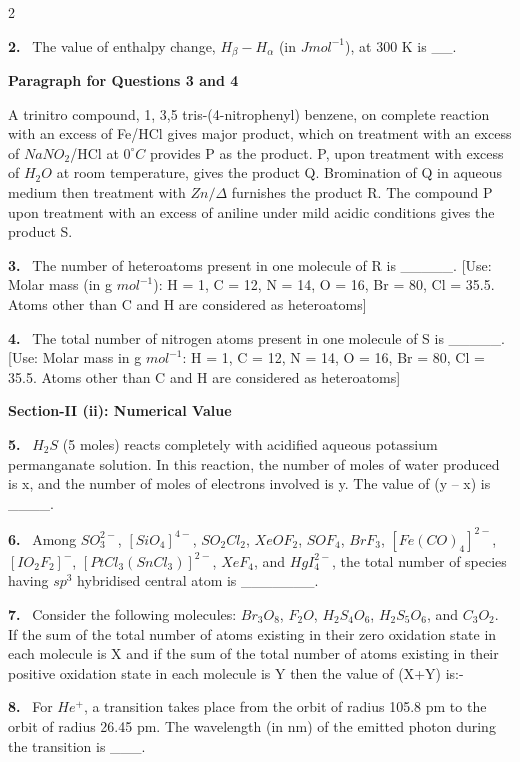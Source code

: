 \documentclass[10pt]{extarticle}
\newcommand{\sect}[1]{\par\smallskip\noindent\textbf{#1}\par}
\newcommand{\qn}[1]{\par\smallskip\noindent\textbf{#1.}~}
\newcommand{\paraq}[2]{\par\smallskip\noindent\textbf{Paragraph for Questions #1 and #2}\par}
\begin{document}
\begin{multicols}{2}
\qn{2} The value of enthalpy change, $H_\beta-H_\alpha$ (in $Jmol^{-1}$), at 300 K is \_\_.

\paraq{3}{4}
A trinitro compound, 1, 3,5 tris-(4-nitrophenyl) benzene, on complete reaction with an excess of Fe/HCl gives major product, which on treatment with an excess of $NaNO_2$/HCl at $0^\circ C$ provides P as the product. P, upon treatment with excess of $H_2O$ at room temperature, gives the product Q. Bromination of Q in aqueous medium then treatment with $Zn/\Delta$ furnishes the product R. The compound P upon treatment with an excess of aniline under mild acidic conditions gives the product S.

\qn{3} The number of heteroatoms present in one molecule of R is \_\_\_\_\_. [Use: Molar mass (in g $mol^{-1}$): H = 1, C = 12, N = 14, O = 16, Br = 80, Cl = 35.5. Atoms other than C and H are considered as heteroatoms]

\qn{4} The total number of nitrogen atoms present in one molecule of S is \_\_\_\_\_. [Use: Molar mass in g $mol^{-1}$: H = 1, C = 12, N = 14, O = 16, Br = 80, Cl = 35.5. Atoms other than C and H are considered as heteroatoms]

\sect{Section-II (ii): Numerical Value}

\qn{5} $H_2S$ (5 moles) reacts completely with acidified aqueous potassium permanganate solution. In this reaction, the number of moles of water produced is x, and the number of moles of electrons involved is y. The value of (y -- x) is \_\_\_\_.

\qn{6} Among $SO_3^{2-}$, $[SiO_4]^{4-}$, $SO_2Cl_2$, $XeOF_2$, $SOF_4$, $BrF_3$, $[Fe(CO)_4]^{2-}$, $[IO_2F_2]^-$, $[PtCl_3(SnCl_3)]^{2-}$, $XeF_4$, and $HgI_4^{2-}$, the total number of species having $sp^3$ hybridised central atom is \_\_\_\_\_\_\_.

\qn{7} Consider the following molecules: $Br_3O_8$, $F_2O$, $H_2S_4O_6$, $H_2S_5O_6$, and $C_3O_2$.\\
If the sum of the total number of atoms existing in their zero oxidation state in each molecule is X and if the sum of the total number of atoms existing in their positive oxidation state in each molecule is Y then the value of (X+Y) is:-

\qn{8} For $He^+$, a transition takes place from the orbit of radius 105.8 pm to the orbit of radius 26.45 pm. The wavelength (in nm) of the emitted photon during the transition is \_\_\_.\\
\relax[Use: Bohr radius, a = 52.9 pm; Rydberg constant, $R_H=2.2\times10^{-18}$ J; Planck's constant, $h=6.6\times10^{-34}$ J s; Speed of light, $c=3\times10^8\ ms^{-1}$]


\end{multicols}
\end{document}
